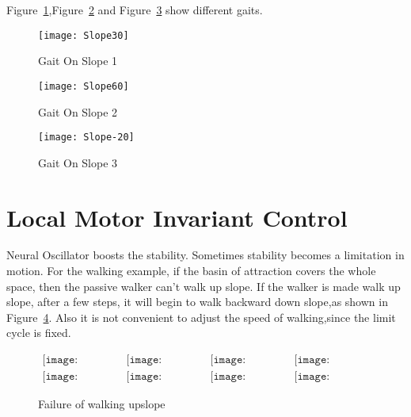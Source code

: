 Figure~\ref{fig:ss1},Figure~\ref{fig:ss2} and Figure~\ref{fig:ss3} show different gaits.

\begin{figure}[!htbp]
  \begin{center}
      \texttt{[image: Slope30]}
    \caption{Gait On Slope 1} 
    \label{fig:ss1}
\end{center}
\end{figure}

\begin{figure}[!htbp]
  \begin{center}
      \texttt{[image: Slope60]}
    \caption{Gait On Slope 2}
    \label{fig:ss2}
\end{center}
\end{figure}

\begin{figure}[!htbp]
  \begin{center}
      \texttt{[image: Slope-20]}
    \caption{Gait On Slope 3}
    \label{fig:ss3}
\end{center}
\end{figure}






\section{Local Motor Invariant Control}
Neural Oscillator boosts the stability.
Sometimes stability becomes a limitation in motion.
For the walking example, if the basin of attraction covers the whole space, then the passive walker can't walk up slope.
If the walker is made walk up slope, after a few steps, it will begin to walk backward down slope,as shown in Figure~\ref{fig:localcontrolwalking}.
Also it is not convenient to adjust the speed of walking,since the limit cycle is fixed.




\begin{figure}[!htbp]
  \begin{center}
         $\begin{array}{cccc}
\texttt{[image: UpFall/0001.eps]}&
\texttt{[image: UpFall/0051.eps]}&
\texttt{[image: UpFall/0101.eps]}&
\texttt{[image: UpFall/0151.eps]}
\\
\texttt{[image: UpFall/0201.eps]}&
\texttt{[image: UpFall/0251.eps]}&
\texttt{[image: UpFall/0301.eps]}&
\texttt{[image: UpFall/0351.eps]}
\end{array}$
    \caption{Failure of walking upslope}
    \label{fig:localcontrolwalking}
\end{center}
\end{figure}


